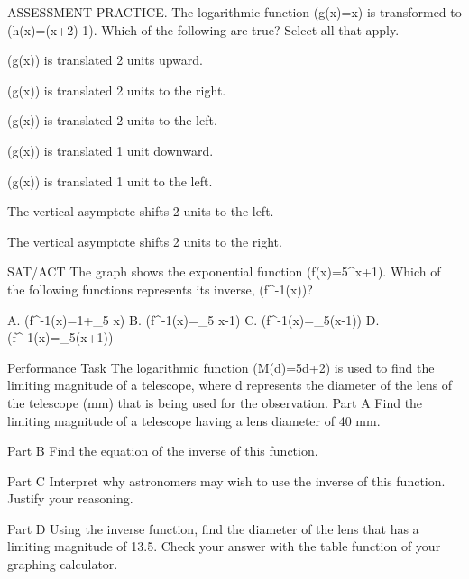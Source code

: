\documentclass{article}
\newenvironment{practice}[2]{}{}        %
\newcommand{\answer}[1]{}               %
\newcommand{\placeholder}[2]{}          %
\newcommand{\uncertain}[2]{#1}          %
\newcommand{\te}[1]{}                   %
\begin{document}
\begin{practice}{31}{2}
ASSESSMENT PRACTICE. The logarithmic function (g(x)=\ln x) is transformed to (h(x)=\ln(x+2)-1). Which of the following are true? Select all that apply.
\item (g(x)) is translated 2 units upward.
\item (g(x)) is translated 2 units to the right.
\item (g(x)) is translated 2 units to the left.
\item (g(x)) is translated 1 unit downward.
\item (g(x)) is translated 1 unit to the left.
\item The vertical asymptote shifts 2 units to the left.
\item The vertical asymptote shifts 2 units to the right.
\answer{(g(x)) is translated 2 units to the left; (g(x)) is translated 1 unit downward; The vertical asymptote shifts 2 units to the left.}
\end{practice}
\begin{practice}{32}{2}
\te{DOK \uncertain{2}{1}; omitted from printed Item Analysis.}
SAT/ACT The graph shows the exponential function (f(x)=5^{x+1}). Which of the following functions represents its inverse, (f^{-1}(x))?
\placeholder{graph}{Blue increasing exponential f=5^{x+1}, unit square grid x,y=-5 to5, axes x,y,O with arrows, labels -4,-2,2,4 both axes. Curve left arrow near x=-5 approaching y=0, passes (-1,1), top arrow at (0,5); no markers.}
A. (f^{-1}(x)=1+\log_5 x)
B. (f^{-1}(x)=\log_5 x-1)
C. (f^{-1}(x)=\log_5(x-1))
D. (f^{-1}(x)=\log_5(x+1))
\answer{C}
\te{Printed C; likely B, since the inverse of (5^{x+1}) is (\log_5 x-1).}
\end{practice}
\begin{practice}{33}{3}
\te{DOK \uncertain{3}{2}; omitted from printed Item Analysis.}
Performance Task The logarithmic function (M(d)=5\log d+2) is used to find the limiting magnitude of a telescope, where d represents the diameter of the lens of the telescope (mm) that is being used for the observation.
Part A Find the limiting magnitude of a telescope having a lens diameter of 40 mm.
\answer{a. magnitude 10}
Part B Find the equation of the inverse of this function.
\answer{b. (d=10^{\frac{M-2}{5}})}
Part C Interpret why astronomers may wish to use the inverse of this function. Justify your reasoning.
\answer{c. Astronomers can use this function when the limiting magnitude of a telescope is known to find the diameter of the lens of the telescope.}
Part D Using the inverse function, find the diameter of the lens that has a limiting magnitude of 13.5. Check your answer with the table function of your graphing calculator.
\answer{d. 199.5 mm}
\end{practice}
\end{document}
